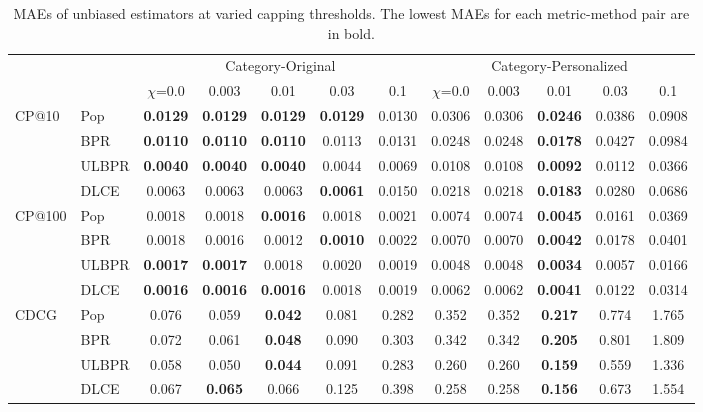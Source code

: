 \documentclass[manuscript,screen]{acmart}
\begin{document}
\begin{table}[htbp]
	\small
	\caption{MAEs of unbiased estimators at varied capping thresholds. The lowest MAEs for each metric-method pair are in bold.}
	\label{tab:valid_estimator}
	\centering
	\begin{tabular}{llcccccccccc}
		\toprule
		& & \multicolumn{5}{c}{Category-Original} & \multicolumn{5}{c}{Category-Personalized}\\
		\cmidrule(lr){3-7} \cmidrule(lr){8-12} 
		& & $\chi$=0.0 & 0.003 & 0.01 & 0.03 & 0.1 & $\chi$=0.0 & 0.003 & 0.01 & 0.03 & 0.1 \\
		\midrule
		CP@10 & Pop & \textbf{0.0129} & \textbf{0.0129} & \textbf{0.0129} & \textbf{0.0129} & 0.0130
		& 0.0306 & 0.0306 & \textbf{0.0246} & 0.0386 & 0.0908 \\
		& BPR & \textbf{0.0110} & \textbf{0.0110} & \textbf{0.0110} & 0.0113 & 0.0131
		& 0.0248 & 0.0248 & \textbf{0.0178} & 0.0427 & 0.0984 \\
		& ULBPR & \textbf{0.0040} & \textbf{0.0040} & \textbf{0.0040} & 0.0044 & 0.0069
		& 0.0108 & 0.0108 & \textbf{0.0092} & 0.0112 & 0.0366 \\
		& DLCE &  0.0063 & 0.0063 & 0.0063 & \textbf{0.0061} & 0.0150
		& 0.0218 & 0.0218 & \textbf{0.0183} & 0.0280 & 0.0686 \\
		\midrule
		CP@100 & Pop & 0.0018 & 0.0018 & \textbf{0.0016} & 0.0018 & 0.0021
		&  0.0074 & 0.0074 & \textbf{0.0045} & 0.0161 & 0.0369 \\
		& BPR & 0.0018 & 0.0016 & 0.0012 & \textbf{0.0010} & 0.0022
		& 0.0070 & 0.0070 & \textbf{0.0042} & 0.0178 & 0.0401 \\
		& ULBPR & \textbf{0.0017} & \textbf{0.0017} & 0.0018 & 0.0020 & 0.0019
		& 0.0048 & 0.0048 & \textbf{0.0034} & 0.0057 & 0.0166 \\
		& DLCE &  \textbf{0.0016} & \textbf{0.0016} & \textbf{0.0016} & 0.0018 & 0.0019 
		& 0.0062 & 0.0062 & \textbf{0.0041} & 0.0122 & 0.0314 \\
		\midrule
		CDCG & Pop & 0.076 & 0.059 & \textbf{0.042} & 0.081 & 0.282
		&  0.352 & 0.352 & \textbf{0.217} & 0.774 & 1.765 \\
		& BPR & 0.072 & 0.061 & \textbf{0.048} & 0.090 & 0.303
		& 0.342 & 0.342 & \textbf{0.205} & 0.801 & 1.809 \\
		& ULBPR & 0.058 & 0.050 & \textbf{0.044} & 0.091 & 0.283
		& 0.260 & 0.260 & \textbf{0.159} & 0.559 & 1.336 \\
		& DLCE &  0.067 & \textbf{0.065} & 0.066 & 0.125 & 0.398 
		& 0.258 & 0.258 & \textbf{0.156} & 0.673 & 1.554 \\
		\bottomrule
	\end{tabular}
\end{table}
\end{document}
